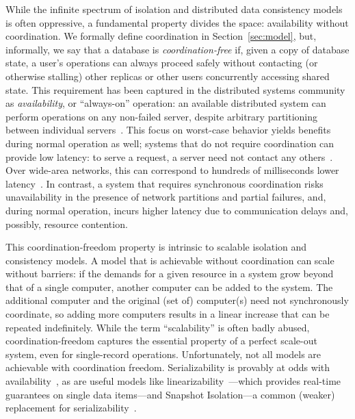  While the infinite spectrum
of isolation and distributed data consistency models is often
oppressive, a fundamental property divides the space: availability
without coordination. We formally define coordination in
Section~\ref{sec:model}, but, informally, we say that a database is
\textit{coordination-free} if, given a copy of database state, a
user's operations can always proceed safely without contacting (or
otherwise stalling) other replicas or other users concurrently
accessing shared state. This requirement has been captured in the
distributed systems community as \textit{availability}, or
``always-on'' operation: an available distributed system can perform
operations on any non-failed server, despite arbitrary partitioning
between individual servers~\cite{gilbert-cap}. This focus on
worst-case behavior yields benefits during normal operation as well;
systems that do not require coordination can provide low latency: to
serve a request, a server need not contact any others~\cite{pacelc}. Over wide-area
networks, this can correspond to hundreds of milliseconds lower
latency~\cite{hat-vldb}. In contrast, a system that requires synchronous coordination
risks unavailability in the presence of network partitions and partial
failures, and, during normal operation, incurs higher latency due to
communication delays and, possibly, resource contention.



This coordination-freedom property is intrinsic to scalable isolation
and consistency models. A model that is achievable without
coordination can scale without barriers: if the demands for a given
resource in a system grow beyond that of a single computer, another
computer can be added to the system. The additional computer and the
original (set of) computer(s) need not synchronously coordinate, so
adding more computers results in a linear increase that can be
repeated indefinitely. While the term ``scalability'' is often badly
abused, coordination-freedom captures the essential property of a
perfect scale-out system, even for single-record operations.
Unfortunately, not all models are achievable with coordination
freedom. Serializability is provably at odds with
availability~\cite{davidson-survey}, as are useful models like
linearizability~\cite{gilbert-cap}---which provides real-time
guarantees on single data items---and Snapshot Isolation---a common
(weaker) replacement for serializability~\cite{hat-vldb}.

